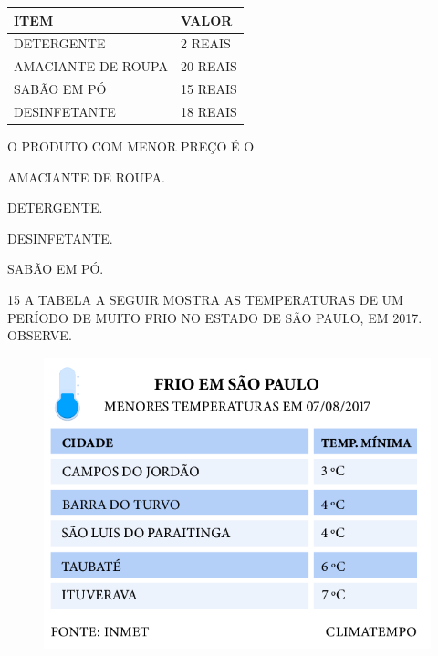 \begin{table}[!ht]
    \centering
    \begin{tabular}{|l|l|}
    \hline
        \textbf{ITEM} & \textbf{VALOR} \\ \hline
        DETERGENTE & 2 REAIS \\ \hline
        AMACIANTE DE ROUPA & 20 REAIS \\ \hline
        SABÃO EM PÓ & 15 REAIS \\ \hline
        DESINFETANTE & 18 REAIS \\ \hline
    \end{tabular}
\end{table}


O PRODUTO COM MENOR PREÇO É O

\begin{multicols}{2}
\begin{escolha}[itemsep=0pt]
\item AMACIANTE DE ROUPA.

\item DETERGENTE.

\item DESINFETANTE.

\item SABÃO EM PÓ.
\end{escolha}
\end{multicols}

\pagebreak
\num{15} A TABELA A SEGUIR MOSTRA AS TEMPERATURAS DE UM PERÍODO DE MUITO FRIO NO ESTADO DE SÃO
PAULO, EM 2017. OBSERVE.


\begin{figure}[H]
\includegraphics[width=\textwidth]{./media/SAEB_1ANO_MAT_FIGURA119.png}
\end{figure}

